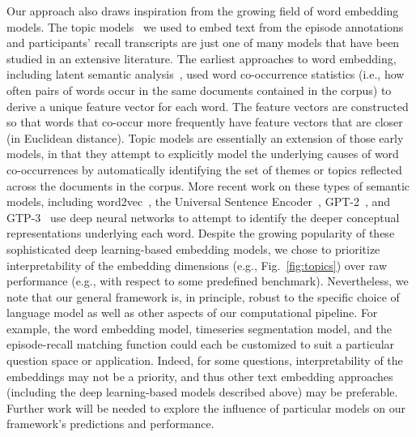 \documentclass[10pt]{article}
\begin{document}
Our approach also draws inspiration from the growing field of word embedding models.  The topic models~\citep{BleiEtal03} we used to embed text from the episode annotations and participants' recall transcripts are just one of many models that have been studied in an extensive literature.  The earliest approaches to word embedding, including latent
semantic analysis~\citep{LandDuma97}, used word co-occurrence statistics (i.e., how often pairs of words occur in the same documents contained in the corpus) to derive a unique feature vector for each word.  The feature vectors are constructed so that words that co-occur more frequently have feature vectors that are closer (in Euclidean distance).  Topic models are essentially an extension of those early models, in that they attempt to explicitly model the underlying causes of word co-occurrences by automatically identifying the set of themes or topics reflected across the documents in the corpus.  More recent work on these types of semantic models, including word2vec~\citep{MikoEtal13}, the Universal Sentence Encoder~\citep{CerEtal18}, GPT-2~\citep{RadfEtal19}, and GTP-3~\citep{BrowEtal20} use deep neural networks to attempt to identify the deeper conceptual representations underlying each word.  Despite the growing popularity of these sophisticated deep learning-based embedding models, we chose to prioritize interpretability of the embedding dimensions (e.g., Fig.~\ref{fig:topics}) over raw performance (e.g., with respect to some predefined benchmark).  Nevertheless, we note that our general framework is, in principle, robust to the specific choice of language model as well as other aspects of our computational pipeline.  For example, the word embedding model, timeseries segmentation model, and the episode-recall matching function could each be customized to suit a particular question space or application.  Indeed, for some questions, interpretability of the embeddings may not be a priority, and thus other text embedding approaches (including the deep learning-based models described above) may be preferable.  Further work will be needed to explore the influence of particular models on our framework's predictions and performance.
\end{document}
